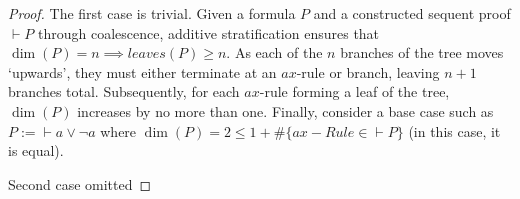 \documentclass{article}
\def\seteq{:=}
\theoremstyle{indented}
\begin{document}
        \begin{proof}
            The first case is trivial.
            Given a formula $P$ and a constructed sequent proof $\vdash P$ through coalescence, additive stratification ensures that $\dim(P) = n \implies leaves(P) \geq n$.
            As each of the $n$ branches of the tree moves `upwards', they must either terminate at an $ax$-rule or branch, leaving $n + 1$ branches total.
            Subsequently, for each $ax$-rule forming a leaf of the tree, $\dim(P)$ increases by no more than one.
            Finally, consider a base case such as $P \seteq \vdash a \vee \neg a$ where $\dim(P) = 2 \leq 1 + \#\{ax-Rule \in \vdash P\}$ (in this case, it is equal).
            
            Second case omitted
        \end{proof}

    
\end{document}
